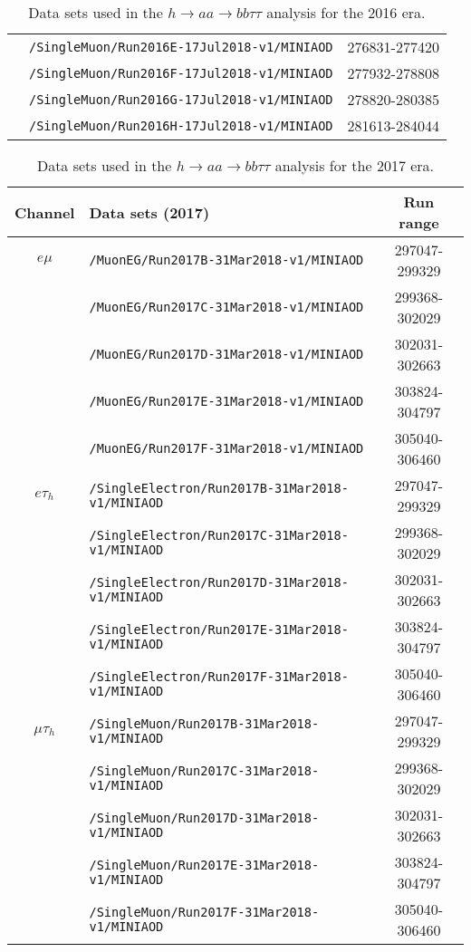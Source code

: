 \begin{table}[ht]
\begin{center}
{\begin{tabular}{|c|l|c|}
    & \texttt{/SingleMuon/Run2016E-17Jul2018-v1/MINIAOD} & 276831-277420\\
    & \texttt{/SingleMuon/Run2016F-17Jul2018-v1/MINIAOD} & 277932-278808\\
    & \texttt{/SingleMuon/Run2016G-17Jul2018-v1/MINIAOD} & 278820-280385\\
    & \texttt{/SingleMuon/Run2016H-17Jul2018-v1/MINIAOD} & 281613-284044\\
    \hline
    \end{tabular}
    }
    \end{center}
    \caption{Data sets used in the $h\rightarrow aa \rightarrow bb\tau\tau$ analysis for the 2016 era.}
    \label{tab:2016datasets}
    \end{table}
    
    \begin{table}[ht]
    \begin{center}
    {\scriptsize
    \begin{tabular}{|c|l|c|}
    \hline
    Channel & Data sets (2017) & Run range\\
    \hline
    $e\mu$ & \texttt{/MuonEG/Run2017B-31Mar2018-v1/MINIAOD} & 297047-299329\\
    & \texttt{/MuonEG/Run2017C-31Mar2018-v1/MINIAOD} & 299368-302029\\
    & \texttt{/MuonEG/Run2017D-31Mar2018-v1/MINIAOD} & 302031-302663\\
    & \texttt{/MuonEG/Run2017E-31Mar2018-v1/MINIAOD} & 303824-304797\\
    & \texttt{/MuonEG/Run2017F-31Mar2018-v1/MINIAOD} & 305040-306460\\
    \hline
    $e\tau_{h}$ & \texttt{/SingleElectron/Run2017B-31Mar2018-v1/MINIAOD} & 297047-299329\\
    & \texttt{/SingleElectron/Run2017C-31Mar2018-v1/MINIAOD} & 299368-302029\\
    & \texttt{/SingleElectron/Run2017D-31Mar2018-v1/MINIAOD} & 302031-302663\\
    & \texttt{/SingleElectron/Run2017E-31Mar2018-v1/MINIAOD} & 303824-304797\\
    & \texttt{/SingleElectron/Run2017F-31Mar2018-v1/MINIAOD} & 305040-306460\\
    \hline
    $\mu\tau_{h}$ & \texttt{/SingleMuon/Run2017B-31Mar2018-v1/MINIAOD} & 297047-299329\\
    & \texttt{/SingleMuon/Run2017C-31Mar2018-v1/MINIAOD} & 299368-302029\\
    & \texttt{/SingleMuon/Run2017D-31Mar2018-v1/MINIAOD} & 302031-302663\\
    & \texttt{/SingleMuon/Run2017E-31Mar2018-v1/MINIAOD} & 303824-304797\\
    & \texttt{/SingleMuon/Run2017F-31Mar2018-v1/MINIAOD} & 305040-306460\\
    \hline
    \end{tabular}
    }
    \end{center}
    \caption{Data sets used in the $h\rightarrow aa \rightarrow bb\tau\tau$ analysis for the 2017 era.}
    \label{tab:2017datasets}
    \end{table}
    
